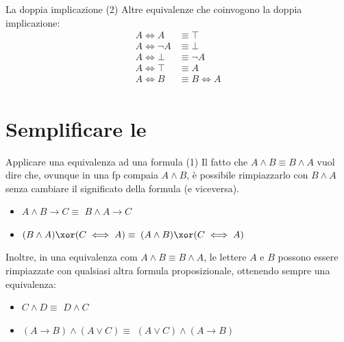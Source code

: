 \documentclass[10pt,dvipsnames]{beamer}
\begin{document}
\begin{frame}{La doppia implicazione (2)}
    Altre equivalenze che coinvogono la doppia implicazione:
    \begin{align*}
        A \iff A      & \equiv \top     \\
        A \iff \neg A & \equiv \bot     \\
        A \iff \bot   & \equiv \neg A   \\
        A \iff \top   & \equiv A        \\
        A \iff B      & \equiv B \iff A \\
    \end{align*}
\end{frame}


\section{Semplificare le \fp}

\begin{frame}{Applicare una equivalenza ad una formula (1)}
    Il fatto che $A \wedge B \equiv B \wedge A$ vuol dire che, ovunque in una fp compaia $A \wedge B$, è possibile rimpiazzarlo con $B \wedge A$ senza cambiare il significato della formula (e viceversa).
    \begin{itemize}
        \item $A \wedge B \to C \equiv$ \pause $B \wedge A \to C$ \pause\
        \item $(B \wedge A) \xor (C \iff A) \equiv$ \pause $(A \wedge B) \xor (C \iff A)$
    \end{itemize}

    \pause
    \medskip
    Inoltre, in una equivalenza com $A \wedge B \equiv B \wedge A$, le lettere $A$ e $B$ possono essere rimpiazzate con qualsiasi altra formula proposizionale, ottenendo sempre una equivalenza:
    \begin{itemize}
        \item $C \wedge D \equiv$ \pause $D \wedge C$ \\
        \item $(A \to B) \wedge (A \vee C) \equiv$ \pause $(A \vee C) \wedge (A \to B)$
    \end{itemize}
\end{frame}
\end{document}
